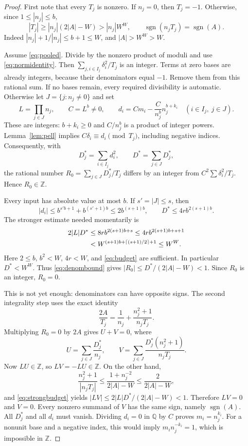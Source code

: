 \documentclass[10pt,letterpaper]{article}
\theoremstyle{remark}\newtheorem{remark}[theorem]{Remark}
\newcommand{\Z}{\mathbb Z}\newcommand{\Q}{\mathbb Q}\newcommand{\N}{\mathbb N}
\newcommand{\sgn}{\operatorname{sgn}}
\begin{document}
\begin{proof}
First note that every $T_j$ is nonzero. If $n_j=0$, then $T_j=-1$.
Otherwise, since $1\le|n_j|\le b$,
\begin{equation}
 |T_j|\ge |n_j|(2|A|-W)>|n_j|W^W,
 \qquad \sgn(n_jT_j)=\sgn(A).\label{eq:denombound}
\end{equation}
Indeed $|n_j|+1/|n_j|\le b+1\le W$, and $|A|>W^W>W$.

Assume \eqref{eq:pooled}. Divide by the nonzero product of moduli and
use \eqref{eq:normidentity}. Then
$\sum_{j,i\in I_j}\delta_i^2/T_j$ is an integer. Terms at zero bases
are already integers, because their denominators equal $-1$. Remove
them from this rational sum. If no bases remain, every required
divisibility is automatic. Otherwise let $J=\{j:n_j\ne0\}$ and set
\[
 L=\prod_{j\in J}n_j,\qquad C=L^b\ne0,
 \qquad
 d_i=Cm_i-\frac{C}{n_j^b}n_j^{b+k_i}\quad(i\in I_j,\ j\in J).
\]
These are integers: $b+k_i\ge0$ and $C/n_j^b$ is a product of
integer powers. Lemma~\ref{lem:pell} implies
$C\delta_i\equiv d_i\pmod{T_j}$, including negative indices.
Consequently, with
\[
 D_j^*=\sum_{i\in I_j}d_i^2,\qquad D^*=\sum_{j\in J}D_j^*,
\]
the rational number $R_0=\sum_{j\in J}D_j^*/T_j$ differs by an integer
from $C^2\sum\delta_i^2/T_j$. Hence $R_0\in\Z$.

Every input has absolute value at most $b$. If $s'=|J|\le s$, then
\[
 |d_i|\le b^{s'b+1}+b^{(s'+1)b}\le2b^{(s+1)b},\qquad
 D^*\le4r b^{2(s+1)b}.
\]
The stronger estimate needed momentarily is
\begin{align}
 2|L|D^*
 &\le8r b^{2(s+1)b+s}
 \le4r b^{2(s+1)b+s+1}\notag\\
 &<W^{(s+1)b+\lceil(s+1)/2\rceil+1}
 \le W^W.\label{eq:strongbudget}
\end{align}
Here $2\le b$, $b^2<W$, $4r<W$, and \eqref{eq:budget} are sufficient.
In particular $D^*<W^W$. Thus \eqref{eq:denombound} gives
$|R_0|\le D^*/(2|A|-W)<1$. Since $R_0$ is an integer, $R_0=0$.

This is not yet enough: denominators can have opposite signs. The second
integrality step uses the exact identity
\begin{equation}
 \frac{2A}{T_j}=\frac1{n_j}
       +\frac{n_j^2+1}{n_jT_j}.\label{eq:split}
\end{equation}
Multiplying $R_0=0$ by $2A$ gives $U+V=0$, where
\[
 U=\sum_{j\in J}\frac{D_j^*}{n_j},\qquad
 V=\sum_{j\in J}\frac{D_j^*(n_j^2+1)}{n_jT_j}.
\]
Now $LU\in\Z$, so $LV=-LU\in\Z$. On the other hand,
\[
 \frac{n_j^2+1}{|n_jT_j|}
 \le\frac{1+n_j^{-2}}{2|A|-W}
 \le\frac2{2|A|-W},
\]
and \eqref{eq:strongbudget} yields
$|LV|\le2|L|D^*/(2|A|-W)<1$. Therefore $LV=0$ and $V=0$.
Every nonzero summand of $V$ has the same sign, namely $\sgn(A)$.
All $D_j^*$ and all $d_i$ must vanish. Dividing $d_i=0$ in $\Q$ by
$C$ proves $m_i=n_j^{k_i}$. For a nonunit base and a negative index,
this would imply $m_i n_j^{-k_i}=1$, which is impossible in $\Z$.


\end{proof}
\end{document}
